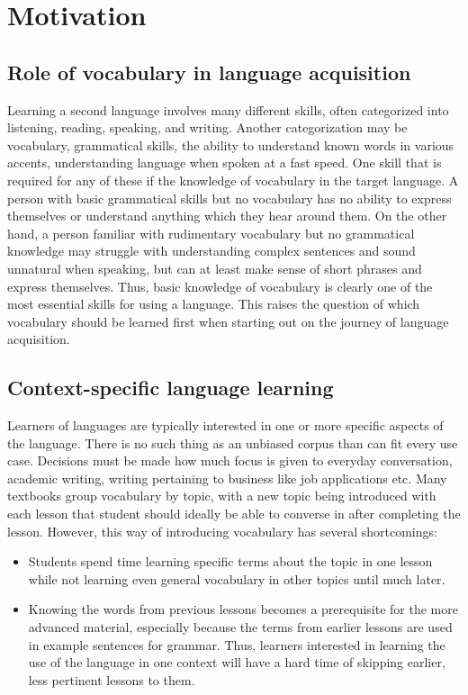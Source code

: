 \section{Motivation}
\subsection{Role of vocabulary in language acquisition}
Learning a second language involves many different skills, often categorized into listening, reading, speaking, and writing.
Another categorization may be vocabulary, grammatical skills, the ability to understand known words in various accents, understanding language when spoken at a fast speed.
One skill that is required for any of these if the knowledge of vocabulary in the target language.
A person with basic grammatical skills but no vocabulary has no ability to express themselves or understand anything which they hear around them.
On the other hand, a person familiar with rudimentary vocabulary but no grammatical knowledge may struggle with understanding complex sentences and sound unnatural when speaking, but can at least make sense of short phrases and express themselves.
Thus, basic knowledge of vocabulary is clearly one of the most essential skills for using a language.
This raises the question of which vocabulary should be learned first when starting out on the journey of language acquisition.


\subsection{Context-specific language learning}
Learners of languages are typically interested in one or more specific aspects of the language.
There is no such thing as an unbiased corpus than can fit every use case.
Decisions must be made how much focus is given to everyday conversation, academic writing, writing pertaining to business like job applications etc.
Many textbooks group vocabulary by topic, with a new topic being introduced with each lesson that student should ideally be able to converse in after completing the lesson.
However, this way of introducing vocabulary has several shortcomings:
\begin{itemize}
	\item Students spend time learning specific terms about the topic in one lesson while not learning even general vocabulary in other topics until much later.
	\item Knowing the words from previous lessons becomes a prerequisite for the more advanced material, especially because the terms from earlier lessons are used in example sentences for grammar.
	      Thus, learners interested in learning the use of the language in one context will have a hard time of skipping earlier, less pertinent lessons to them.
\end{itemize}

